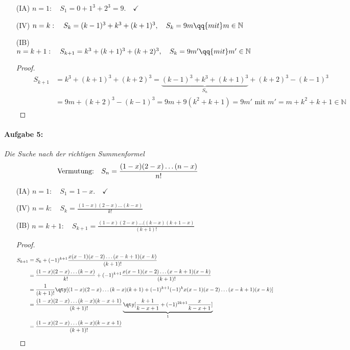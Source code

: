 \begin{enumerate}
    \item[(IA)] $n=1: \quad S_1 = 0 + 1^3 + 2^3 = 9. \quad\checkmark$ 
    \item[(IV)] $n=k: \quad S_k = (k-1)^3 + k^3 + (k+1)^3, \quad S_k = 9m \qq{mit} m \in \mathbb{N}$
    \item[(IB)] $n=k+1: \quad S_{k+1} = k^3 + (k+1)^3 + (k+2)^3, \quad S_k = 9m' \qq{mit} m' \in \mathbb{N}$\\
    \begin{proof}$~$\\[-1.4cm]
        \begin{align}
            \qquad S_{k+1}&=k^3+(k+1)^3+(k+2)^3=\underbrace{(k-1)^3+k^3+(k+1)^3}_{S_n}+(k+2)^3-(k-1)^3\\
            &=9m+(k+2)^3-(k-1)^3=9m+9(k^2+k+1)=9m' \text{ mit } m'=m+k^2+k+1\in\mathbb{N}
        \end{align}
    \end{proof}
\end{enumerate}
%
\paragraph{Aufgabe 5: } \emph{Die Suche nach der richtigen Summenformel}\\
\begin{align}
\text{Vermutung: }\hspace{0.2cm} S_n=\frac{(1-x)(2-x)\dots(n-x)}{n!} \hspace{0.5cm}
\end{align}

\begin{enumerate}
    \setlength{\mathindent}{0cm}
    \item[(IA)] $n=1: \quad S_1 = 1-x. \quad\checkmark$ 
    \item[(IV)] $n=k: \quad S_k = \frac{(1-x)(2-x)\dots(k-x)}{k!}$
    \item[(IB)] $n=k+1: \quad S_{k+1} = \frac{(1-x)(2-x)\dots((k-x)(k+1-x)}{(k+1)!}$\\
    \begin{proof}
        \begin{align}
            S_{k+1}&=S_k+(-1)^{k+1}\frac{x(x-1)(x-2)\dots(x-k+1)(x-k)}{(k+1)!}\\
            &=\frac{(1-x)(2-x)\dots(k-x)}{k!}+(-1)^{k+1}\frac{x(x-1)(x-2)\dots(x-k+1)(x-k)}{(k+1)!}\\
            &=\frac{1}{(k+1)!}\qty[(1-x)(2-x)\dots(k-x)(k+1)+(-1)^{k+1}(-1)^kx(x-1)(x-2)\dots(x-k+1)(x-k)]\\
            &=\frac{(1-x)(2-x)\dots(k-x)(k-x+1)}{(k+1)!}\underbrace{\qty[\frac{k+1}{k-x+1}+(-1)^{2k+1}\frac{x}{k-x+1}]}_1\\
            &=\frac{(1-x)(2-x)\dots(k-x)(k-x+1)}{(k+1)!}
        \end{align}
    \end{proof}
\end{enumerate}


